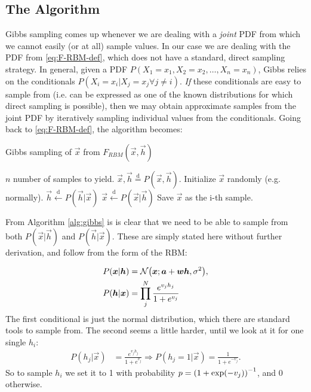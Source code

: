\documentclass[a4paper, 11pt]{article}
\newcommand{\drawfrom}{\overset{\mathrm{d}}{=}}
\newcommand{\setfrom}{\overset{\mathrm{d}}{\leftarrow}}
\begin{document}
\begin{multicols}{2}
    \subsection{The Algorithm} 
    
    Gibbs sampling comes up whenever we are dealing
    with a \emph{joint} PDF from which we cannot easily (or at all) sample
    values.  In our case we are dealing with the PDF from
    \autoref{eq:F-RBM-def}, which does not have a standard, direct sampling
    strategy.  In general, given a PDF $P(X_1=x_1, X_2=x_2,\dots,X_n=x_n)$,
    Gibbs relies on the conditionals $P(X_i=x_i | X_j = x_j \forall j\neq i)$.
    \emph{If} these conditionals are easy to sample from (i.e. can be expressed
    as one of the known distributions for which direct sampling is possible),
    then we may obtain approximate samples from the joint PDF by iteratively
    sampling individual values from the conditionals. Going back to
    \autoref{eq:F-RBM-def}, the algorithm becomes:

\begin{algorithm}[H]
    \caption{Gibbs sampling of $\vec x$ from $F_{RBM}(\vec x, \vec h)$}
    \label{alg:gibbs}
\begin{algorithmic}
    \REQUIRE $n$ number of samples to yield.
    \ENSURE $\vec x,\vec h \drawfrom P(\vec x, \vec h)$.
    \STATE Initialize $\vec x$ randomly (e.g. normally).
        \STATE $\vec h \setfrom P(\vec h | \vec x)$
        \STATE $\vec x \setfrom P(\vec x | \vec h)$
        \STATE Save $\vec x$ as the i-th sample.
    \ENDFOR
\end{algorithmic}
\end{algorithm}

    From Algorithm \ref{alg:gibbs} is is clear that we need to be able to sample from
    both $P(\vec x|\vec h)$ and $P(\vec h|\vec x)$. These are simply stated here
    without further derivation, and follow from the form of the RBM:

    \begin{align}
        P(\bm x|\bm h) &= \mathcal{N}\qty(\bm x; \bm a + \bm w\bm h,
        \sigma^2)\label{eq:P-x-cond-h},\\
        P(\bm h|\bm x) &= \prod_{j}^N \frac{e^{v_j h_j}}{1+e^{v_j}}
    \end{align}
    The first conditional is just the normal distribution, which there are
    standard tools to sample from. The second seems a little harder, until we
    look at it for one single $h_i$:
    \begin{align}
        P(h_j|\vec x) &= \frac{e^{v_j h_j}}{1+e^{v_j}}
        \Rightarrow P(h_j=1|\vec x) = \frac{1}{1+e^{-v_j}}.
    \end{align}
    So to sample $h_i$ we set it to 1 with probability
    $p=\qty(1+\exp(-v_j))^{-1}$, and 0 otherwise.
    

\end{multicols}
\end{document}

